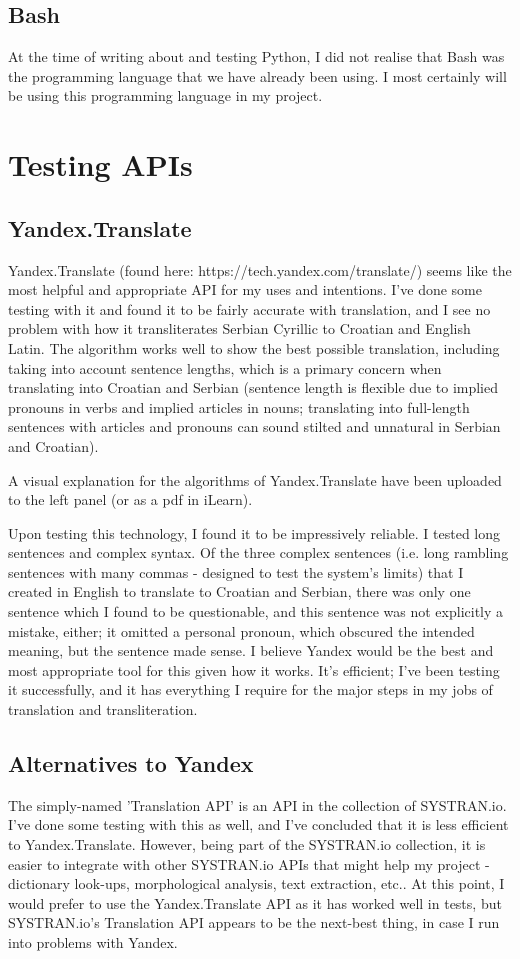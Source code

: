 \documentclass{article}
\begin{document}
\subsection{Bash}
At the time of writing about and testing Python, I did not realise that Bash was the programming language that we have already been using. I most certainly will be using this programming language in my project.

\section{Testing APIs}
\subsection{Yandex.Translate}
Yandex.Translate (found here: https://tech.yandex.com/translate/) seems like the most helpful and appropriate API for my uses and intentions. I've done some testing with it and found it to be fairly accurate with translation, and I see no problem with how it transliterates Serbian Cyrillic to Croatian and English Latin. The algorithm works well to show the best possible translation, including taking into account sentence lengths, which is a primary concern when translating into Croatian and Serbian (sentence length is flexible due to implied pronouns in verbs and implied articles in nouns; translating into full-length sentences with articles and pronouns can sound stilted and unnatural in Serbian and Croatian).

A visual explanation for the algorithms of Yandex.Translate have been uploaded to the left panel (or as a pdf in iLearn).

Upon testing this technology, I found it to be impressively reliable. I tested long sentences and complex syntax. Of the three complex sentences (i.e. long rambling sentences with many commas - designed to test the system's limits) that I created in English to translate to Croatian and Serbian, there was only one sentence which I found to be questionable, and this sentence was not explicitly a mistake, either; it  omitted a personal pronoun, which obscured the intended meaning, but the sentence made sense. I believe Yandex would be the best and most appropriate tool for this given how it works. It's efficient; I've been testing it successfully, and it has everything I require for the major steps in my jobs of translation and transliteration.

\subsection{Alternatives to Yandex}
The simply-named 'Translation API' is an API in the collection of SYSTRAN.io. I've done some testing with this as well, and I've concluded that it is less efficient to Yandex.Translate. However, being part of the SYSTRAN.io collection, it is easier to integrate with other SYSTRAN.io APIs that might help my project - dictionary look-ups, morphological analysis, text extraction, etc.. At this point, I would prefer to use the Yandex.Translate API as it has worked well in tests, but SYSTRAN.io's Translation API appears to be the next-best thing, in case I run into problems with Yandex.
\end{document}
